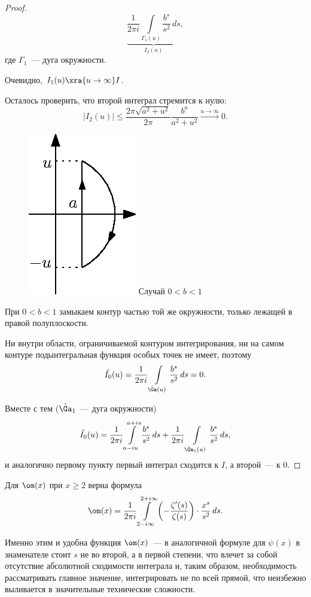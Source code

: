 \begin{proof}
$$\underbrace{\frac{1}{2\pi i}\int\limits_{\Gamma_1(u)}\frac{b^s}{s^2}\,ds}_{I_2(u)},$$
где $\Gamma_1$~— дуга окружности.\par
Очевидно, $I_1(u)\xra{u\to\infty}I$.\par
Осталось проверить, что второй интеграл стремится к нулю:
$$|I_2(u)| \leqslant \frac{2\pi\sqrt{a^2 + u^2}}{2\pi}\frac{b^a}{a^2 + u^2}\xrightarrow{u \to \infty} 0.$$\par
\begin{figure}
\begin{center}
\vskip -30pt
\includegraphics[scale=1.0]{05013}
Случай $0 < b < 1$
\end{center}
\end{figure}
 При $0 < b <1$ замыкаем контур частью той же окружности, только лежащей в правой полуплоскости.\par
Ни внутри области, ограничиваемой контуром интегрирования, ни на самом контуре подынтегральная функция особых точек не имеет, поэтому
$$\hat{I_0}(u) = \frac{1}{2\pi i}\int\limits_{\hat{\Ga}(u)} \frac{b^s}{s^2}\,ds = 0.$$\par
Вместе с тем ($\hat{\Ga}_1$~— дуга окружности) $$\hat{I_0}(u)=\frac{1}{2\pi i}\int\limits_{a - iu}^{a + iu}\frac{b^s}{s^2}\,ds+
\frac{1}{2\pi i}\int\limits_{\hat{\Ga}_1(u)}\frac{b^s}{s^2}\,ds,$$
и аналогично первому пункту первый интеграл сходится к $I$, а второй~— к $0$.
\end{proof}
\begin{stm}
Для $\om(x)$ при $x\ge2$ верна формула
$$\om(x)=\frac{1}{2\pi i}\int\limits_{2 - i\infty}^{2 + i\infty}\left(-\frac{\zeta '(s)}{\zeta(s)}\right) \cdot \frac{x^s}{s^2}\,ds.$$
\end{stm}
\begin{note}
Именно этим и удобна функция $\om(x)$~— в аналогичной формуле для $\psi(x)$ в знаменателе стоит $s$ не во второй, а в первой степени, что влечет за собой отсутствие абсолютной сходимости интеграла и, таким образом, необходимость рассматривать главное значение, интегрировать не по всей прямой, что неизбежно выливается в значительные технические сложности.
\end{note}
